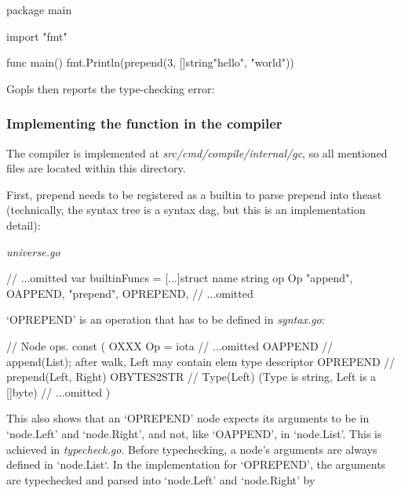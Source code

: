 \begin{gocode}
package main

import "fmt"

func main() {
    fmt.Println(prepend(3, []string{"hello", "world"}))
}
\end{gocode}

Gopls then reports the type-checking error:

\subsubsection{Implementing the function in the compiler}

The compiler is implemented at \textit{src/cmd/compile/internal/gc},
so all mentioned files are located within this directory.


First, prepend needs to be registered as a builtin to parse prepend into
the\gls{ast} (technically, the syntax tree is a syntax \gls{dag}\cite{ast-node-dag},
but this is an implementation detail):


\textit{universe.go}
\begin{gocode}
// ...omitted
var builtinFuncs = [...]struct {
    name string
    op   Op
}{
    {"append", OAPPEND},
    {"prepend", OPREPEND},
    // ...omitted
}
\end{gocode}

`OPREPEND' is an operation that has to be defined in \textit{syntax.go}:

\begin{gocode}
// Node ops.
const (
    OXXX Op = iota
    // ...omitted
    OAPPEND       // append(List); after walk, Left may contain elem type descriptor
    OPREPEND      // prepend(Left, Right)
    OBYTES2STR    // Type(Left) (Type is string, Left is a []byte)
    // ...omitted
)
\end{gocode}

This also shows that an `OPREPEND' node expects its arguments to be in `node.Left' and `node.Right', and not, like `OAPPEND', in `node.List'. This is achieved in
\textit{typecheck.go}. Before typechecking, a node's arguments are always
defined in `node.List`. In the implementation for `OPREPEND', the arguments are typechecked and parsed
into `node.Left' and `node.Right' by

